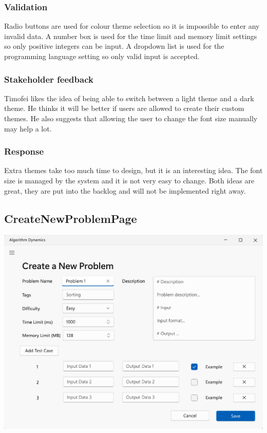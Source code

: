 \documentclass[a4paper]{report}
\begin{document}
\subsubsection{Validation}

Radio buttons are used for colour theme selection so it is impossible to enter any invalid data. A number box is used for the time limit and memory limit settings so only positive integers can be input. A dropdown list is used for the programming language setting so only valid input is accepted.

\subsubsection{Stakeholder feedback}
\label{subsubsec:settingspage stakeholder feedback}

Timofei likes the idea of being able to switch between a light theme and a dark theme. He thinks it will be better if users are allowed to create their custom themes. He also suggests that allowing the user to change the font size manually may help a lot.

\subsubsection{Response}

Extra themes take too much time to design, but it is an interesting idea. The font size is managed by the system and it is not very easy to change. Both ideas are great, they are put into the backlog and will not be implemented right away.

\subsection{CreateNewProblemPage}

\includegraphics[width=\textwidth, height=\textheight, keepaspectratio]{CreateNewProblemPage-design}
\end{document}
